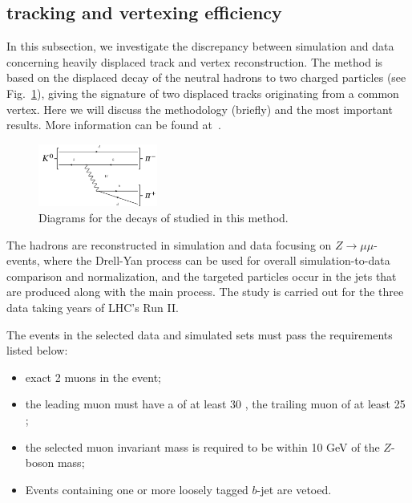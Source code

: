\subsection{\Displ tracking and vertexing efficiency}
\label{sec:displacedvertex}

In this subsection, we investigate the discrepancy between simulation
and data concerning heavily displaced track and vertex
reconstruction. The method is based on the displaced decay of the
neutral hadrons \PKzS to two charged particles (see
Fig.~\ref{fig:diagrams}), giving the signature of two displaced tracks
originating from a common vertex. Here we will discuss the methodology
(briefly) and the most important results. More information can be found at~\cite{AN-20-111_KshortStudy}.
\begin{figure}[h]
    \centering
    \includegraphics[width=0.35\textwidth]{Figures/c6/efficiencies/diagram_ks}
    \caption{Diagrams for the decays of \PKzS studied in this method.}
    \label{fig:diagrams}
\end{figure}

The \PKzS hadrons are reconstructed in simulation and data focusing on $Z\rightarrow \mu\mu$-events, where the Drell-Yan process can be used for overall simulation-to-data comparison and normalization, and the targeted particles occur in the jets that are produced along with the main process. The study is carried out for the three data taking years of LHC's Run II.

\noindent The events in the selected data and simulated sets must pass the requirements listed below:
\begin{itemize}
\setlength\itemsep{-0.2em}
    \item exact 2 muons in the event;
    \item the leading muon must have a \pt of at least 30 \GeV, the trailing muon of at least 25 \GeV;
    \item the selected muon invariant mass is required to be within 10 GeV of the $Z$-boson mass;
    \item Events containing one or more loosely tagged $b$-jet are vetoed.
\end{itemize}


